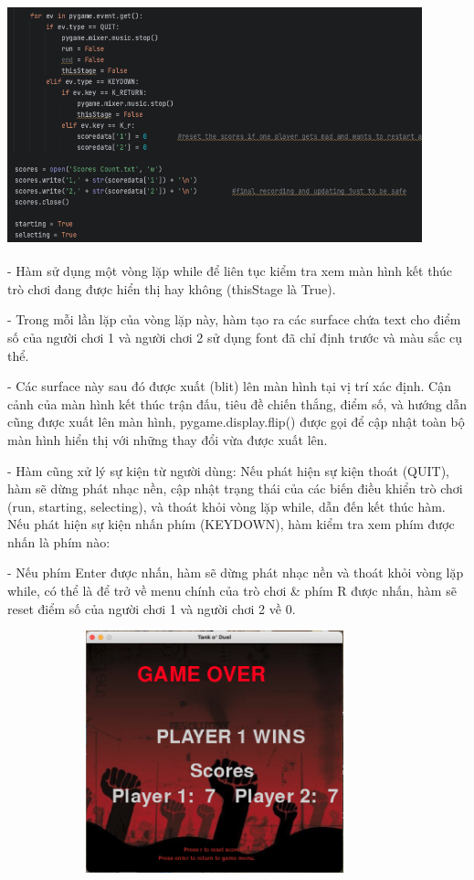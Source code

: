 \documentclass[a4paper]{article}
\begin{document}
         \includegraphics[width=12cm,height=7cm]{kq2.png}

    - Hàm sử dụng một vòng lặp while để liên tục kiểm tra xem màn hình kết thúc trò chơi đang được hiển thị hay không (thisStage là True).
    
    - Trong mỗi lần lặp của vòng lặp này, hàm tạo ra các surface chứa text cho điểm số của người chơi 1 và người chơi 2 sử dụng font đã chỉ định trước và màu sắc cụ thể.
    
    - Các surface này sau đó được xuất (blit) lên màn hình tại vị trí xác định. Cận cảnh của màn hình kết thúc trận đấu, tiêu đề chiến thắng, điểm số, và hướng dẫn cũng được xuất lên màn hình, pygame.display.flip() được gọi để cập nhật toàn bộ màn hình hiển thị với những thay đổi vừa được xuất lên.
    
    - Hàm cũng xử lý sự kiện từ người dùng: Nếu phát hiện sự kiện thoát (QUIT), hàm sẽ dừng phát nhạc nền, cập nhật trạng thái của các biến điều khiển trò chơi (run, starting, selecting), và thoát khỏi vòng lặp while, dẫn đến kết thúc hàm. Nếu phát hiện sự kiện nhấn phím
(KEYDOWN), hàm kiểm tra xem phím được nhấn là phím nào:

    - Nếu phím Enter được nhấn, hàm sẽ dừng phát nhạc nền và thoát khỏi vòng lặp while, có thể là để trở về menu chính của trò chơi & phím R được nhấn, hàm sẽ reset điểm số của người chơi 1 và người chơi 2 về 0.

    \includegraphics[width=12cm,height=7cm]{imgkq.png}
    
\end{document}
